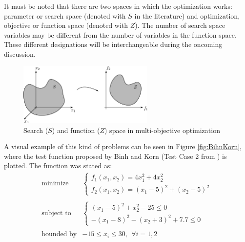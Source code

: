     \newpage
    
    It must be noted that there are two spaces in which the optimization works: parameter or search space (denoted with $S$ in the literature) and optimization, objective or function space (denoted with $Z$). The number of search space variables may be different from the number of variables in the function space. These different designations will be interchangeable during the oncoming discussion. 
    
    \begin{figure}[h!]
        \centering
        \includegraphics[width=0.6\textwidth]{Figures/2/searchSpaceFunction.png}
        \caption{Search ($S$) and function ($Z$) space in multi-objective optimization}
        \label{fig:twoSpaces}
    \end{figure}    
    
    A visual example of this kind of problems can be seen in Figure \ref{fig:BihnKorn}, where the test function proposed by Binh and Korn (Test Case 2 from \cite{binh1997mobes}) is plotted. The function was stated as:
    \begin{equation}
        \begin{array}{cl}
            \textrm{minimize} & 
            \left\{ \begin{array}{l}
                f_1(x_1,x_2) = 4x_1^2 + 4x_2^2\\
                f_2(x_1,x_2) = (x_1-5)^2+(x_2-5)^2
            \end{array} \right. \\
            & \\
            \textrm{subject to} &  
            \left\{ \begin{array}{l}
                (x_1-5)^2+x_2^2-25 \leq 0\\
                -(x_1-8)^2-(x_2+3)^2 + 7.7 \leq 0
            \end{array} \right. \\
            & \\
            \textrm{bounded by} & -15 \leq x_i \leq 30, \ \ \forall i = 1,2
        \end{array}
        \label{eq:BihnKorn}
    \end{equation}
    
